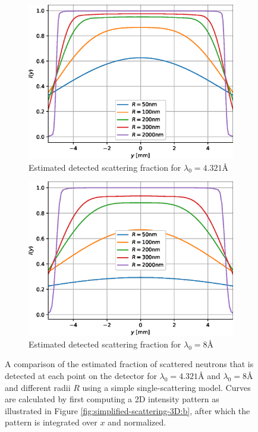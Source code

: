 \documentclass{article}
\begin{document}
\begin{figure}[htbp]
	\centering
	\begin{subfigure}[b]{0.49\textwidth}
		\centering
		\includegraphics[width=\textwidth]{simplified-I-scattering-4.321}
		\caption{Estimated detected scattering fraction for $\lambda_0 = 4.321$Å}
		\label{fig:simplified-scattering-4.321}
	\end{subfigure}
	\hfill
	\begin{subfigure}[b]{0.49\textwidth}
		\centering
		\includegraphics[width=\textwidth]{simplified-I-scattering-8.0}
		\caption{Estimated detected scattering fraction for $\lambda_0 = 8$Å}
		\label{fig:simplified-scattering-8}
	\end{subfigure}
	\caption{A comparison of the estimated fraction of scattered neutrons that is detected at each point on the detector for $\lambda_0 = 4.321$Å and $\lambda_0 = 8$Å and different radii $R$ using a simple single-scattering model. Curves are calculated by first computing a 2D intensity pattern as illustrated in Figure \ref{fig:simplified-scattering-3D:b}, after which the pattern is integrated over $x$ and normalized.} 
	\label{fig:simplified-scattering}
\end{figure}
\end{document}
